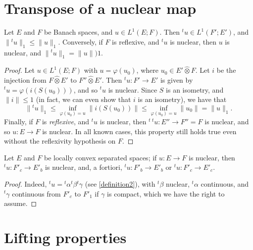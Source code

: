 \documentclass{article}
\theoremstyle{plain}
\newenvironment{proposition}[1]
    {\renewcommand\theinnercustomproposition{#1}\innercustomproposition}
    {\endinnercustomproposition}
\newenvironment{corollary}[1]
    {\renewcommand\theinnercustomcorollary{#1}\innercustomcorollary}
    {\endinnercustomcorollary}
\theoremstyle{definition}
\newcommand{\cotimes}{\widehat{\otimes}}
\newcommand{\transpose}[1]{{}^t\!{#1}}
\renewcommand{\leq}{\leqslant}
\begin{document}
\section{Transpose of a nuclear map}
\label{section5}

\begin{proposition}{6}
\label{proposition6}
  Let $E$ and $F$ be Banach spaces, and $u\in L^1(E;F)$.
  Then $\transpose{u}\in L^1(F';E')$, and $\|\transpose{u}\|_1\leq\|u\|_1$.
  Conversely, if $F$ is reflexive, and $\transpose{u}$ is nuclear, then $u$ is nuclear, and $\|\transpose{u}\|_1=\|u\|)1$.
\end{proposition}

\begin{proof}
  Let $u\in L^1(E;F)$ with $u=\varphi(u_0)$, where $u_0\in E'\cotimes F$.
  Let $i$ be the injection from $F\cotimes E'$ to $F''\cotimes E'$.
  Then $\transpose{u}\colon F'\to E'$ is given by $\transpose{u}=\varphi(i(S(u_0)))$, and so $\transpose{u}$ is nuclear.
  Since $S$ is an isometry, and $\|i\|\leq1$ (in fact, we can even show that $i$ is an isometry), we have that
  \[
    \|\transpose{u}\|_1
    \leq \inf_{\varphi(u_0)=u} \|i(S(u_0))\|
    \leq \inf_{\varphi(u_0)=u} \|u_0\|
    = \|u\|_1.
  \]
  Finally, if $F$ is \emph{reflexive}, and $\transpose{u}$ is nuclear, then $\transpose{\,\transpose{u}}\colon E''\to F''=F$ is nuclear, and so $u\colon E\to F$ is nuclear.
  In all known cases, this property still holds true even without the reflexivity hypothesis on $F$.
\end{proof}

\begin{corollary}{1}
\label{corollary-6}
  Let $E$ and $F$ be locally convex separated spaces;
  if $u\colon E\to F$ is nuclear, then $\transpose{u}\colon F'_c\to E'_b$ is nuclear, and, a fortiori, $\transpose{u}\colon F'_b\to E'_b$ or $\transpose{u}\colon F'_c\to E'_c$.
\end{corollary}

\begin{proof}
  Indeed, $\transpose{u}=\transpose{\alpha}\transpose{\beta}\transpose{\gamma}$ (see \cref{definition2}), with $\transpose{\beta}$ nuclear, $\transpose{\alpha}$ continuous, and $\transpose{\gamma}$ continuous from $F'_c$ to $F'_1$ if $\gamma$ is compact, which we have the right to assume.
\end{proof}


\section{Lifting properties}
\label{section6}
\end{document}

